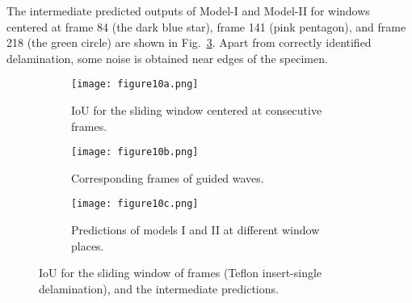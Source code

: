 \begin{sloppypar}
	The intermediate predicted outputs of Model-I and Model-II for windows centered at frame 84 (the dark blue star), frame 141 (pink pentagon), and frame 218 (the green circle) are shown in Fig.~\ref{fig:CFRP_teflon_3o_intermediate}.
	Apart from correctly identified delamination, some noise is obtained near edges of the specimen.
	\begin{figure} [!ht]
		\begin{subfigure}[b]{1\textwidth}
			\centering
			\texttt{[image: figure10a.png]}
			\caption{IoU for the sliding window centered at consecutive frames.}
			\label{fig:CFRP_Teflon_3o_IoU_}
		\end{subfigure}
		\par\medskip
		\begin{subfigure}[b]{1\textwidth}
			\centering
			\texttt{[image: figure10b.png]}
			\caption{Corresponding frames of guided waves.} 
			\label{fig:CFRP_teflon_3o_shapes_}
		\end{subfigure}
		\par\medskip
		\begin{subfigure}[b]{1\textwidth}
			\centering
			\texttt{[image: figure10c.png]}
			\caption{Predictions of models I and II at different window places.} 
			\label{fig:CFRP_teflon_3o_intermediate}
		\end{subfigure}
		\caption{IoU for the sliding window of frames (Teflon insert-single delamination), and the intermediate predictions.}
		\label{fig:CFRP_Teflon_3o_IoU_centre_window}
	\end{figure} 
	

\end{sloppypar}
